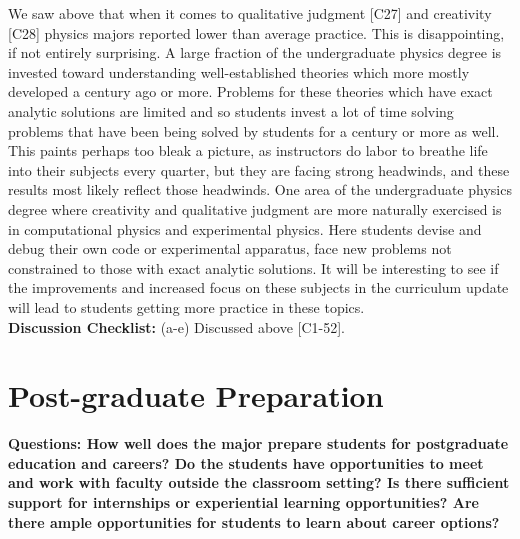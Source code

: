 \documentclass[12pt]{article}
\begin{document}
We saw above that when it comes to qualitative judgment [C27] and
creativity [C28] physics majors reported lower than average practice.
This is disappointing, if not entirely surprising.  A large
fraction of the undergraduate physics degree is invested toward
understanding well-established theories which more mostly developed a
century ago or more.  Problems for these theories which have exact
analytic solutions are limited and so students invest a lot of time
solving problems that have been being solved by students for a century
or more as well.  This paints perhaps too bleak a picture, as
instructors do labor to breathe life into their subjects every quarter,
but they are facing strong headwinds, and these results most likely
reflect those headwinds.  One area of the undergraduate physics degree
where creativity and qualitative judgment are more naturally exercised
is in computational physics and experimental physics.  Here students
devise and debug their own code or experimental apparatus, face new
problems not constrained to those with exact analytic solutions.  It
will be interesting to see if the improvements and increased focus on
these subjects in the curriculum update will lead to students getting
more practice in these topics.\\[3pt]

\noindent
{\bf Discussion Checklist:} (a-e) Discussed above [C1-52].

\newpage
\section{Post-graduate Preparation}
{\bf Questions: How well does the major prepare students for postgraduate education and careers? 
Do the students have opportunities to meet and work with faculty outside the classroom 
setting? Is there sufficient support for internships or experiential learning opportunities? 
Are there ample opportunities for students to learn about career options?}
  

\end{document}
